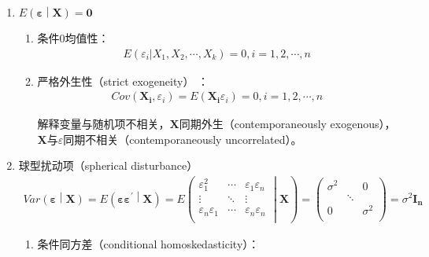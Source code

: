 \documentclass[12pt]{book}
\begin{document}
\begin{enumerate}[1.]
    \item $E\left(\bm{\varepsilon}\middle|\bm{X}\right)=\bm{0}$
          \begin{enumerate}[(1)]
              \item 条件0均值性：
                    \begin{gather*}
                        E\left(\varepsilon_i|X_1,X_2,\cdots,X_k\right)=0, i=1,2,\cdots,n
                    \end{gather*}
              \item 严格外生性（strict exogeneity） ：
                    \begin{gather*}
                        Cov\left(\mathbf{X_i},\varepsilon_i\right)=E(\mathbf{X_i}\varepsilon_{i})=0, i=1,2,\cdots,n
                    \end{gather*}
                    \par 解释变量与随机项不相关，$\bm{X}$同期外生（contemporaneously exogenous），$\bm{X}$与$\varepsilon$同期不相关（contemporaneously uncorrelated）。
          \end{enumerate}
    \item 球型扰动项（spherical disturbance）
          \begin{gather*}
              Var\left(\bm{\varepsilon}\middle|\bm{X} \right)
              =E\left( \bm{\varepsilon}\bm{\varepsilon}^\prime\middle|\bm{X} 	\right)
              =E\left( \begin{matrix}
                  \varepsilon_1^2            & \cdots & \varepsilon_1\varepsilon_n \\\vdots&\ddots&\vdots\\
                  \varepsilon_n\varepsilon_1 & \cdots & \varepsilon_n\varepsilon_n \\
              \end{matrix} \middle|\bm{X}\right)
              =\left(\begin{matrix}
                      \sigma^2 & \      & 0        \\
                      \        & \ddots & \        \\
                      0        & \      & \sigma^2 \\
                  \end{matrix}\right)
              =\sigma^2\mathbf{I_n}
          \end{gather*}
          \begin{enumerate}[(1)]
              \item 条件同方差（conditional homoskedasticity）：

\end{enumerate}
\end{enumerate}
\end{document}
